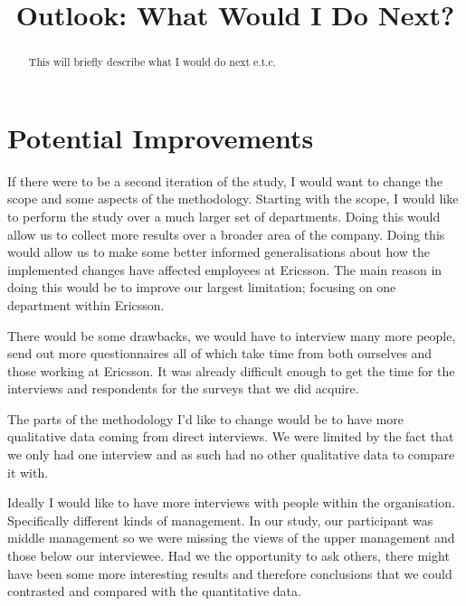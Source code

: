 \documentclass[conference]{IEEEtran}
\begin{document}
%
\title{Outlook: What Would I Do Next?}

\author{

}

\maketitle

\begin{abstract}
This will briefly describe what I would do next e.t.c.

\cite{kitchenham2002preliminary}

\end{abstract}

\IEEEpeerreviewmaketitle

\section{Potential Improvements}

If there were to be a second iteration of the study, I would want to change the scope and some aspects of the methodology. Starting with the scope, I 
would like to perform the study over a much larger set of departments. Doing this would allow us to collect more results over a broader area of the company.
Doing this would allow us to make some better informed generalisations about 
how the implemented changes have affected employees at Ericsson. The main reason in doing this would be to improve our largest limitation; focusing on one department within Ericsson.

There would be some drawbacks, we would have to interview many more people, send out more questionnaires all of which take time from both ourselves and those working at Ericsson. It was already difficult enough to get the time for the interviews and respondents for the surveys that we did acquire. 

The parts of the methodology I'd like to change would be to have more qualitative data coming from direct interviews. We were limited by the fact that we only had one interview and as such had no other qualitative data to compare it with. 

Ideally I would like to have more interviews with people within the organisation. Specifically different kinds of management. In our study, our participant was middle management so we were missing the views of the upper management and those below our interviewee. Had we the opportunity to ask others, there might have been some more interesting results and therefore conclusions that we could contrasted and compared with the quantitative data.
\end{document}
